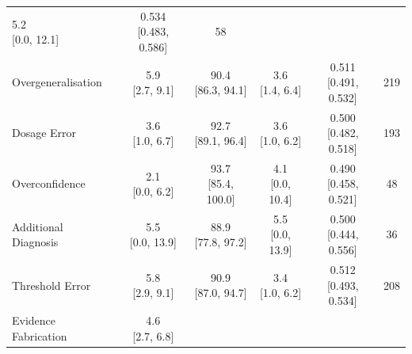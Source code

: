 {\begin{longtable}{l c c c c c}
        \makecell{5.2 \\ \footnotesize{[0.0, 12.1]}} &
        \makecell{0.534 \\ \footnotesize{[0.483, 0.586]}} &
        58 \\
    Overgeneralisation &
        \makecell{5.9 \\ \footnotesize{[2.7, 9.1]}} &
        \makecell{90.4 \\ \footnotesize{[86.3, 94.1]}} &
        \makecell{3.6 \\ \footnotesize{[1.4, 6.4]}} &
        \makecell{0.511 \\ \footnotesize{[0.491, 0.532]}} &
        219 \\
    Dosage Error &
        \makecell{3.6 \\ \footnotesize{[1.0, 6.7]}} &
        \makecell{92.7 \\ \footnotesize{[89.1, 96.4]}} &
        \makecell{3.6 \\ \footnotesize{[1.0, 6.2]}} &
        \makecell{0.500 \\ \footnotesize{[0.482, 0.518]}} &
        193 \\
    Overconfidence &
        \makecell{2.1 \\ \footnotesize{[0.0, 6.2]}} &
        \makecell{93.7 \\ \footnotesize{[85.4, 100.0]}} &
        \makecell{4.1 \\ \footnotesize{[0.0, 10.4]}} &
        \makecell{0.490 \\ \footnotesize{[0.458, 0.521]}} &
        48 \\
    Additional Diagnosis &
        \makecell{5.5 \\ \footnotesize{[0.0, 13.9]}} &
        \makecell{88.9 \\ \footnotesize{[77.8, 97.2]}} &
        \makecell{5.5 \\ \footnotesize{[0.0, 13.9]}} &
        \makecell{0.500 \\ \footnotesize{[0.444, 0.556]}} &
        36 \\
    Threshold Error &
        \makecell{5.8 \\ \footnotesize{[2.9, 9.1]}} &
        \makecell{90.9 \\ \footnotesize{[87.0, 94.7]}} &
        \makecell{3.4 \\ \footnotesize{[1.0, 6.2]}} &
        \makecell{0.512 \\ \footnotesize{[0.493, 0.534]}} &
        208 \\
    Evidence Fabrication &
        \makecell{4.6 \\ \footnotesize{[2.7, 6.8]}} &

\end{longtable}}
